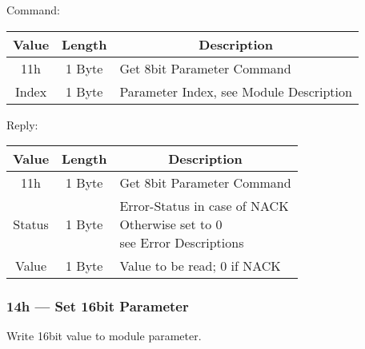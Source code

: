 Command:
\begin{table}[H]
    \centering
    \begin{tabular}{|c|c|l|}
        \hline
        \textbf{Value}   &   \textbf{Length} & \multicolumn{1}{|c|}{\textbf{Description}}\\ \hline \hline
        11h   &  1 Byte & Get 8bit Parameter Command \\ \hline
        Index & 1 Byte  & Parameter Index, see Module Description \\ \hline
    \end{tabular}
\label{tab:CAN-11-C}
\end{table}
Reply:
\begin{table}[H]
    \centering
    \begin{tabular}{|c|c|l|}
        \hline
        \textbf{Value}   &   \textbf{Length} & \multicolumn{1}{|c|}{\textbf{Description}}\\ \hline \hline
        11h   &  1 Byte & Get 8bit Parameter Command \\ \hline
        Status & 1 Byte & \makecell[l]{Error-Status in case of NACK \\ Otherwise set to 0\\see Error Descriptions}\\ \hline
        Value & 1 Byte & Value to be read; 0 if NACK \\ \hline
    \end{tabular}
\label{tab:CAN-11-R}
\end{table}

\subsubsection{14h --- Set 16bit Parameter}
Write 16bit value to module parameter.

